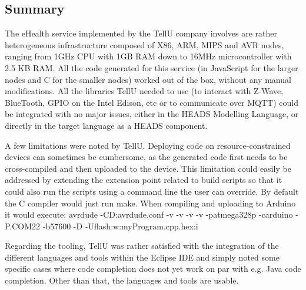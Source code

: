 \subsection{Summary}
The eHealth service implemented by the TellU company involves are rather heterogeneous infrastructure composed of X86, ARM, MIPS and AVR nodes, ranging from 1GHz CPU with 1GB RAM down to 16MHz microcontroller with 2.5 KB RAM. All the code generated for this service (in JavaScript for the larger nodes and C for the smaller nodes) worked out of the box, without any manual modifications. All the libraries TellU needed to use (to interact with Z-Wave, BlueTooth, GPIO on the Intel Edison, etc or to communicate over MQTT) could be integrated with no major issues, either in the HEADS Modelling Language, or directly in the target language as a HEADS component.  

A few limitations were noted by TellU. Deploying code on resource-constrained devices can sometimes be cumbersome, as the generated code first needs to be cross-compiled and then uploaded to the device. This limitation could easily be addressed by extending the extension point related to build scripts so that it could also run the scripts using a command line the user can override. By default the C compiler would just run make. When compiling and uploading to Arduino it would execute: avrdude -CD:avrdude.conf -v -v -v -v -patmega328p -carduino -P.COM22 -b57600 -D -Uflash:w:myProgram.cpp.hex:i 

Regarding the tooling, TellU was rather satisfied with the integration of the different languages and tools within the Eclipse IDE and simply noted some specific cases where code completion does not yet work on par with e.g. Java code completion. Other than that, the languages and tools are usable.
